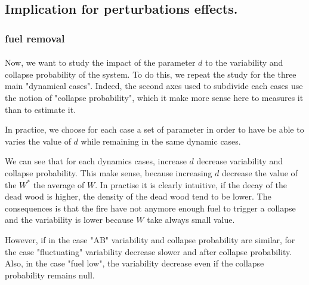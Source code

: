 \documentclass{article}
\begin{document}


\newpage
\subsection{Implication for perturbations effects.}


\subsubsection{fuel removal}
\label{fuel_removal}
\paragraph{}
Now, we want to study the impact of the parameter $d$ to the variability and collapse probability of the system. To do this, we repeat the study for the three main "dynamical cases". Indeed, the second axes used to subdivide each cases use the notion of "collapse probability", which it make more sense here to measures it than to estimate it. 

In practice, we choose for each case a set of parameter in order to have be able to varies the value of $d$ while remaining in the same dynamic cases.

We can see that for each dynamics cases, increase $d$ decrease variability and collapse probability. This make sense, because increasing $d$ decrease the value of the $W^*$ the average of $W$. In practise it is clearly intuitive, if the decay of the dead wood is higher, the density of the dead wood tend to be lower. The consequences is that the fire have not anymore enough fuel to trigger a collapse and the variability is lower because $W$ take always small value.

However, if in the case "AB" variability and collapse probability are similar, for the case "fluctuating" variability decrease slower and after collapse probability. Also, in the case "fuel low", the variability decrease even if the collapse probability remains null.
\end{document}
